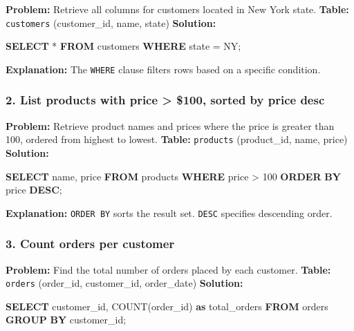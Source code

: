 \documentclass[
  11pt,
  openany,
  oneside]{book}
\newenvironment{Shaded}{}{}
\newcommand{\DecValTok}[1]{\textcolor[rgb]{0.25,0.63,0.44}{#1}}
\newcommand{\FunctionTok}[1]{\textcolor[rgb]{0.02,0.16,0.49}{#1}}
\newcommand{\KeywordTok}[1]{\textcolor[rgb]{0.00,0.44,0.13}{\textbf{#1}}}
\newcommand{\NormalTok}[1]{#1}
\newcommand{\OperatorTok}[1]{\textcolor[rgb]{0.40,0.40,0.40}{#1}}
\newcommand{\StringTok}[1]{\textcolor[rgb]{0.25,0.44,0.63}{#1}}
\begin{document}
\textbf{Problem:} Retrieve all columns for customers located in New York
state. \textbf{Table:} \texttt{customers} (customer\_id, name, state)
\textbf{Solution:}

\begin{Shaded}
\begin{Highlighting}[]
\KeywordTok{SELECT} \OperatorTok{*} \KeywordTok{FROM}\NormalTok{ customers }\KeywordTok{WHERE}\NormalTok{ state }\OperatorTok{=} \StringTok{\textquotesingle{}NY\textquotesingle{}}\NormalTok{;}
\end{Highlighting}
\end{Shaded}

\textbf{Explanation:} The \texttt{WHERE} clause filters rows based on a
specific condition.

\subsubsection{2. List products with price \textgreater{} \$100, sorted
by price desc}\label{list-products-with-price-100-sorted-by-price-desc}

\textbf{Problem:} Retrieve product names and prices where the price is
greater than 100, ordered from highest to lowest. \textbf{Table:}
\texttt{products} (product\_id, name, price) \textbf{Solution:}

\begin{Shaded}
\begin{Highlighting}[]
\KeywordTok{SELECT}\NormalTok{ name, price }\KeywordTok{FROM}\NormalTok{ products }\KeywordTok{WHERE}\NormalTok{ price }\OperatorTok{\textgreater{}} \DecValTok{100} \KeywordTok{ORDER} \KeywordTok{BY}\NormalTok{ price }\KeywordTok{DESC}\NormalTok{;}
\end{Highlighting}
\end{Shaded}

\textbf{Explanation:} \texttt{ORDER\ BY} sorts the result set.
\texttt{DESC} specifies descending order.

\subsubsection{3. Count orders per
customer}\label{count-orders-per-customer}

\textbf{Problem:} Find the total number of orders placed by each
customer. \textbf{Table:} \texttt{orders} (order\_id, customer\_id,
order\_date) \textbf{Solution:}

\begin{Shaded}
\begin{Highlighting}[]
\KeywordTok{SELECT}\NormalTok{ customer\_id, }\FunctionTok{COUNT}\NormalTok{(order\_id) }\KeywordTok{as}\NormalTok{ total\_orders }\KeywordTok{FROM}\NormalTok{ orders }\KeywordTok{GROUP} \KeywordTok{BY}\NormalTok{ customer\_id;}
\end{Highlighting}
\end{Shaded}
\end{document}
